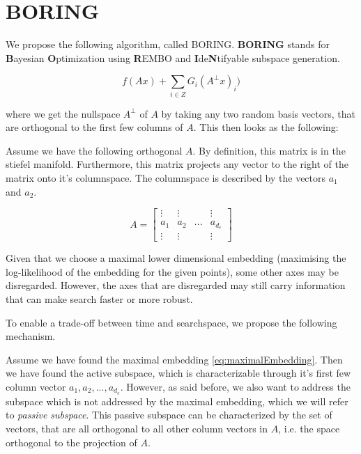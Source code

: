 \section{BORING}

We propose the following algorithm, called BORING. \textbf{BORING} stands for \textbf{B}ayesian \textbf{O}ptimization using \textbf{R}EMBO and \textbf{I}de\textbf{N}tifyable subspace generation.

\begin{equation}
f(A x) + \sum_{i \in Z} G_i( A^{\bot} x)_i )
\label{eq:dimRedEquation}
\end{equation}

where we get the nullspace $A^{\bot}$ of $A$ by taking any two random basis vectors, that are orthogonal to the first few columns of $A$.
This then looks as the following:

Assume we have the following orthogonal $A$. By definition, this matrix is in the stiefel manifold.
Furthermore, this matrix projects any vector to the right of the matrix onto it's columnspace.
The columnspace is described by the vectors $a_1$ and $a_2$.

\begin{equation}
A = 
\begin{bmatrix}
 \vdots & \vdots & & \vdots \\
 a_1 & a_2 & ... & a_{d_e} \\
 \vdots & \vdots & & \vdots
\end{bmatrix}
\label{eq:maximalEmbedding}
\end{equation}

Given that we choose a maximal lower dimensional embedding (maximising the log-likelihood of the embedding for the given points), some other axes may be disregarded.
However, the axes that are disregarded may still carry information that can make search faster or more robust.

To enable a trade-off between time and searchspace, we propose the following mechanism.


Assume we have found the maximal embedding \ref{eq:maximalEmbedding}.
Then we have found the active subspace, which is characterizable through it's first few column vector $  a_1, a_2, ..., a_{d_e} $.
However, as said before, we also want to address the subspace which is not addressed by the maximal embedding, which we will refer to \textit{passive subspace}.
This passive subspace can be characterized by the set of vectors, that are all orthogonal to all other column vectors in $A$, i.e. the space orthogonal to the projection of $A$.


